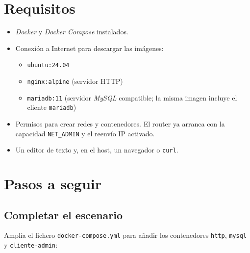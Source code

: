 \documentclass[a4paper]{article}
\begin{document}
\section{Requisitos}
\label{sec:orged0fd47}

\begin{itemize}
\item \emph{Docker} y \emph{Docker Compose} instalados.
\item Conexión a Internet para descargar las imágenes:
\begin{itemize}
\item \texttt{ubuntu:24.04}
\item \texttt{nginx:alpine} (servidor HTTP)
\item \texttt{mariadb:11} (servidor \emph{MySQL} compatible; la misma imagen incluye el cliente \texttt{mariadb})
\end{itemize}
\item Permisos para crear redes y contenedores. El router ya arranca con la capacidad \texttt{NET\_ADMIN} y el reenvío IP activado.
\item Un editor de texto y, en el host, un navegador o \texttt{curl}.
\end{itemize}
\section{Pasos a seguir}
\label{sec:orgfafef55}

\subsection{Completar el escenario}
\label{sec:orgff63caf}

Amplía el fichero \texttt{docker-compose.yml} para añadir los contenedores \texttt{http}, \texttt{mysql} y \texttt{cliente-admin}:
\end{document}
